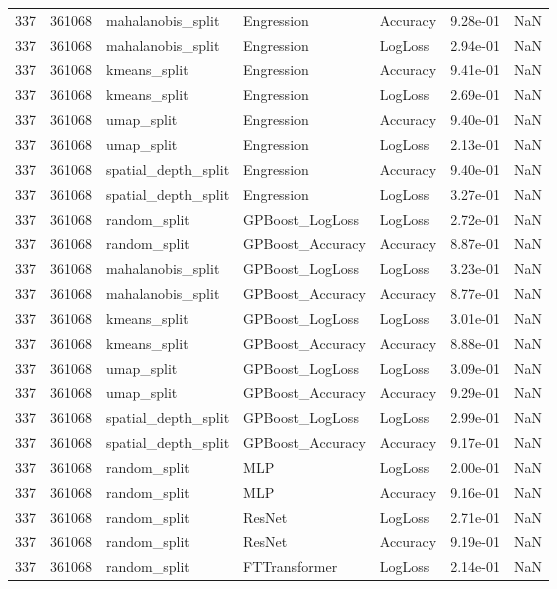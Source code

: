 \begin{tabular}{rrlllrr}
337 & 361068 & mahalanobis\_split & Engression & Accuracy & 9.28e-01 & NaN \\
337 & 361068 & mahalanobis\_split & Engression & LogLoss & 2.94e-01 & NaN \\
337 & 361068 & kmeans\_split & Engression & Accuracy & 9.41e-01 & NaN \\
337 & 361068 & kmeans\_split & Engression & LogLoss & 2.69e-01 & NaN \\
337 & 361068 & umap\_split & Engression & Accuracy & 9.40e-01 & NaN \\
337 & 361068 & umap\_split & Engression & LogLoss & 2.13e-01 & NaN \\
337 & 361068 & spatial\_depth\_split & Engression & Accuracy & 9.40e-01 & NaN \\
337 & 361068 & spatial\_depth\_split & Engression & LogLoss & 3.27e-01 & NaN \\
337 & 361068 & random\_split & GPBoost\_LogLoss & LogLoss & 2.72e-01 & NaN \\
337 & 361068 & random\_split & GPBoost\_Accuracy & Accuracy & 8.87e-01 & NaN \\
337 & 361068 & mahalanobis\_split & GPBoost\_LogLoss & LogLoss & 3.23e-01 & NaN \\
337 & 361068 & mahalanobis\_split & GPBoost\_Accuracy & Accuracy & 8.77e-01 & NaN \\
337 & 361068 & kmeans\_split & GPBoost\_LogLoss & LogLoss & 3.01e-01 & NaN \\
337 & 361068 & kmeans\_split & GPBoost\_Accuracy & Accuracy & 8.88e-01 & NaN \\
337 & 361068 & umap\_split & GPBoost\_LogLoss & LogLoss & 3.09e-01 & NaN \\
337 & 361068 & umap\_split & GPBoost\_Accuracy & Accuracy & 9.29e-01 & NaN \\
337 & 361068 & spatial\_depth\_split & GPBoost\_LogLoss & LogLoss & 2.99e-01 & NaN \\
337 & 361068 & spatial\_depth\_split & GPBoost\_Accuracy & Accuracy & 9.17e-01 & NaN \\
337 & 361068 & random\_split & MLP & LogLoss & 2.00e-01 & NaN \\
337 & 361068 & random\_split & MLP & Accuracy & 9.16e-01 & NaN \\
337 & 361068 & random\_split & ResNet & LogLoss & 2.71e-01 & NaN \\
337 & 361068 & random\_split & ResNet & Accuracy & 9.19e-01 & NaN \\
337 & 361068 & random\_split & FTTransformer & LogLoss & 2.14e-01 & NaN \\

\end{tabular}
